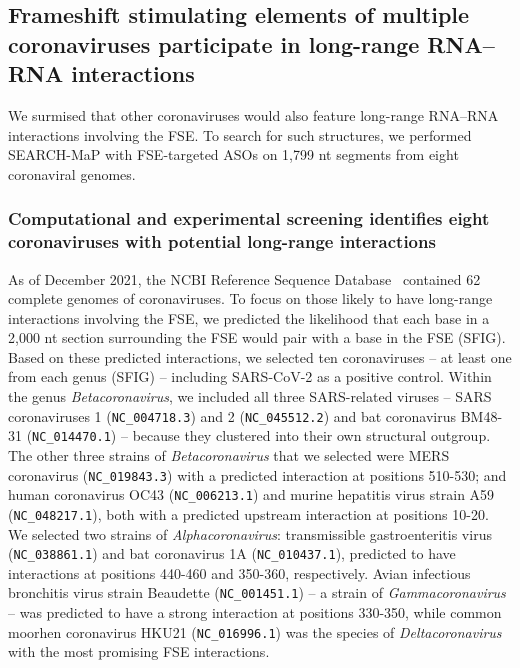 \documentclass[main.tex]{subfiles}
\begin{document}
\subsection{Frameshift stimulating elements of multiple coronaviruses participate in long-range RNA--RNA interactions}

We surmised that other coronaviruses would also feature long-range RNA--RNA interactions involving the FSE.
To search for such structures, we performed SEARCH-MaP with FSE-targeted ASOs on 1,799 nt segments from eight coronaviral genomes.

\subsubsection{Computational and experimental screening identifies eight coronaviruses with potential long-range interactions}

As of December 2021, the NCBI Reference Sequence Database~\cite{OLeary2016} contained 62 complete genomes of coronaviruses.
To focus on those likely to have long-range interactions involving the FSE, we predicted the likelihood that each base in a 2,000 nt section surrounding the FSE would pair with a base in the FSE (SFIG).
Based on these predicted interactions, we selected ten coronaviruses -- at least one from each genus (SFIG) -- including SARS-CoV-2 as a positive control.
Within the genus \textit{Betacoronavirus}, we included all three SARS-related viruses -- SARS coronaviruses 1 (\verb|NC_004718.3|) and 2 (\verb|NC_045512.2|) and bat coronavirus BM48-31 (\verb|NC_014470.1|) -- because they clustered into their own structural outgroup.
The other three strains of \textit{Betacoronavirus} that we selected were MERS coronavirus (\verb|NC_019843.3|) with a predicted interaction at positions 510-530; and human coronavirus OC43 (\verb|NC_006213.1|) and murine hepatitis virus strain A59 (\verb|NC_048217.1|), both with a predicted upstream interaction at positions 10-20.
We selected two strains of \textit{Alphacoronavirus}: transmissible gastroenteritis virus (\verb|NC_038861.1|) and bat coronavirus 1A (\verb|NC_010437.1|), predicted to have interactions at positions 440-460 and 350-360, respectively.
Avian infectious bronchitis virus strain Beaudette (\verb|NC_001451.1|) -- a strain of \textit{Gammacoronavirus} -- was predicted to have a strong interaction at positions 330-350, while common moorhen coronavirus HKU21 (\verb|NC_016996.1|) was the species of \textit{Deltacoronavirus} with the most promising FSE interactions.
\end{document}

